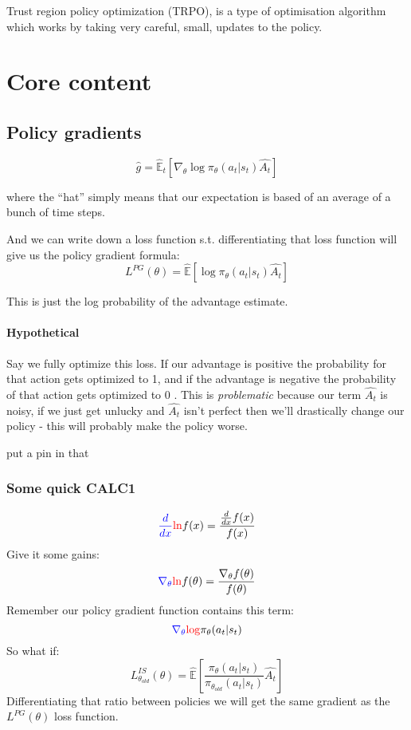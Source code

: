 \documentclass{article}
\begin{document}
Trust region policy optimization (TRPO), is a type of optimisation algorithm which works by taking very careful, small, updates to the policy.  


\section[high]{Core content}

\subsection{Policy gradients}
\[\hat{g} = \hat{\mathbb{E}}_t \left [ \nabla_\theta \log{\pi_\theta} (a_t|s_t) \hat{A_t}  \right] \]

where the ``hat'' simply means that our expectation is based of an average of a bunch of time steps.

And we can write down a loss function s.t. differentiating that loss function will give us the policy gradient formula:
\[ L^{PG}(\theta) = \hat{\mathbb{E}} \left[  \log{\pi_\theta} (a_t|s_t) \hat{A_t} \right] \]

This is just the log probability of the advantage estimate.

\paragraph{Hypothetical} Say we fully optimize this loss. If our advantage is positive the probability for that action gets optimized to 1, and if the advantage is negative the probability of that action gets optimized to 0
. This is \emph{problematic} because our term \(\hat{A_t}\) is noisy, if we just get unlucky and \(\hat{A_t}\) isn't perfect then we'll drastically change our policy - this will probably make the policy worse.

\begin{center}
    put a pin in that
\end{center}

\subsubsection{Some quick CALC1}
\[
    \textcolor{blue} { \frac{d}{dx} } \textcolor{red}{\ln}  {f(x)} = \frac{\frac{d}{dx}f(x)}{f(x)}   
\]
Give it some gains:
\[
    \textcolor{blue} { \nabla_\theta } \textcolor{red} {\ln}{f(\theta)}  = \frac{\nabla_\theta f(\theta)}{f(\theta)}   
\]
Remember our policy gradient function contains this term:
\[
    \textcolor{blue} { \nabla_\theta } \textcolor{red} {\log}{\pi_\theta} (a_t|s_t)
\]
So what if:
\[
    L_{\theta_{old}}^{IS} (\theta) = \hat{\mathbb{E}} \left[  \frac{{\pi_\theta} (a_t|s_t)}{{\pi_{\theta_{old}}} (a_t|s_t)} \hat{A_t} \right]
\]
Differentiating that ratio between policies we will get the same gradient as the \(L^{PG}(\theta)\) loss function.
\end{document}
